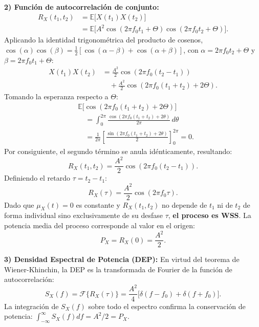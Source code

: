 \documentclass[conference]{IEEEtran}
\begin{document}
\textbf{2) Función de autocorrelación de conjunto:}
\begin{align}
R_X(t_1, t_2) &= \mathbb{E}\big[ X(t_1) X(t_2) \big] \nonumber \\
&= \mathbb{E}\big[ A^2 \cos(2\pi f_0 t_1 + \Theta) \cos(2\pi f_0 t_2 + \Theta) \big].
\end{align}
Aplicando la identidad trigonométrica del producto de cosenos, $\cos(\alpha)\cos(\beta) = \frac{1}{2}[\cos(\alpha - \beta) + \cos(\alpha + \beta)]$, con $\alpha = 2\pi f_0 t_2 + \Theta$ y $\beta = 2\pi f_0 t_1 + \Theta$:
\begin{align}
X(t_1)X(t_2) &= \frac{A^2}{2} \cos(2\pi f_0 (t_2 - t_1)) \nonumber \\
&\quad + \frac{A^2}{2} \cos(2\pi f_0 (t_1 + t_2) + 2\Theta).
\end{align}
Tomando la esperanza respecto a $\Theta$:
\begin{align}
&\mathbb{E}\big[\cos(2\pi f_0 (t_1 + t_2) + 2\Theta)\big] \nonumber \\
&\quad = \int_0^{2\pi} \frac{\cos(2\pi f_0 (t_1 + t_2) + 2\theta)}{2\pi} \, d\theta \nonumber \\
&\quad = \frac{1}{2\pi} \left[ \frac{\sin(2\pi f_0(t_1+t_2) + 2\theta)}{2} \right]_0^{2\pi} = 0.
\end{align}
Por consiguiente, el segundo término se anula idénticamente, resultando:
\begin{equation}
R_X(t_1, t_2) = \frac{A^2}{2} \cos(2\pi f_0 (t_2 - t_1)).
\end{equation}
Definiendo el retardo $\tau = t_2 - t_1$:
\begin{equation}
R_X(\tau) = \frac{A^2}{2} \cos(2\pi f_0 \tau).
\label{eq:rx_teorica}
\end{equation}
Dado que $\mu_X(t) = 0$ es constante y $R_X(t_1, t_2)$ no depende de $t_1$ ni de $t_2$ de forma individual sino exclusivamente de su desfase $\tau$, \textbf{el proceso es WSS}. La potencia media del proceso corresponde al valor en el origen:
\begin{equation}
P_X = R_X(0) = \frac{A^2}{2}.
\label{eq:potencia_teorica}
\end{equation}

\textbf{3) Densidad Espectral de Potencia (DEP):}
En virtud del teorema de Wiener-Khinchin, la DEP es la transformada de Fourier de la función de autocorrelación:
\begin{equation}
S_X(f) = \mathcal{F}\{R_X(\tau)\} = \frac{A^2}{4} \big[ \delta(f - f_0) + \delta(f + f_0) \big].
\label{eq:dep_teorica}
\end{equation}
La integración de $S_X(f)$ sobre todo el espectro confirma la conservación de potencia: $\int_{-\infty}^{\infty} S_X(f) df = A^2/2 = P_X$.
\end{document}
